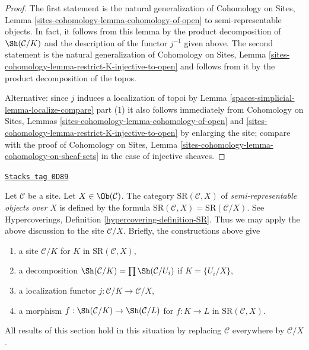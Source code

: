 \begin{proof}
The first statement is the natural generalization of
Cohomology on Sites, Lemma
\ref{sites-cohomology-lemma-cohomology-of-open}
to semi-representable objects.
In fact, it follows from this lemma
by the product decomposition of $\Sh(\mathcal{C}/K)$
and the description of the functor $j^{-1}$ given above.
The second statement is the natural generalization of
Cohomology on Sites, Lemma
\ref{sites-cohomology-lemma-restrict-K-injective-to-open}
and follows from it by the product decomposition of the topos.

\medskip\noindent
Alternative: since $j$ induces a localization of topoi by
Lemma \ref{spaces-simplicial-lemma-localize-compare} part (1)
it also follows immediately from
Cohomology on Sites, Lemmas \ref{sites-cohomology-lemma-cohomology-of-open}
and \ref{sites-cohomology-lemma-restrict-K-injective-to-open}
by enlarging the site; compare with the proof of
Cohomology on Sites, Lemma
\ref{sites-cohomology-lemma-cohomology-on-sheaf-sets}
in the case of injective sheaves.
\end{proof}

\begin{remark}

\label{spaces-simplicial-remark-semi-representable-over-object}
\href{https://stacks.math.columbia.edu/tag/0D89}{\texttt{Stacks tag 0D89}}

Let $\mathcal{C}$ be a site. Let $X \in \Ob(\mathcal{C})$.
The category $\text{SR}(\mathcal{C}, X)$
of {\it semi-representable objects over $X$}
is defined by the formula
$\text{SR}(\mathcal{C}, X) = \text{SR}(\mathcal{C}/X)$.
See Hypercoverings, Definition \ref{hypercovering-definition-SR}.
Thus we may apply the above discussion to the site
$\mathcal{C}/X$. Briefly, the constructions above give
\begin{enumerate}
\item a site $\mathcal{C}/K$ for $K$ in $\text{SR}(\mathcal{C}, X)$,
\item a decomposition
$\Sh(\mathcal{C}/K) = \prod \Sh(\mathcal{C}/U_i)$ if $K = \{U_i/X\}$,
\item a localization functor $j : \mathcal{C}/K \to \mathcal{C}/X$,
\item a morphism $f : \Sh(\mathcal{C}/K) \to \Sh(\mathcal{C}/L)$
for $f : K \to L$ in $\text{SR}(\mathcal{C}, X)$.
\end{enumerate}
All results of this section hold in this situation by replacing
$\mathcal{C}$ everywhere by $\mathcal{C}/X$.
\end{remark}

